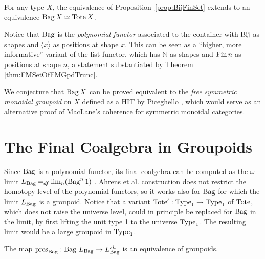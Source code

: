 \documentclass[a4paper,USenglish,cleveref]{lipics-v2021}
\begin{document}
  \begin{proposition}\label{prop:BagTote}
    For any type $X$, the equivalence of Proposition~\ref{prop:BijFinSet} extends to an equivalence $\Bag X \simeq \Tote X$.
  \end{proposition}
 Notice that $\Bag$ is the \emph{polynomial functor} associated to the container with $\Bij$ as shapes and $\langle x \rangle$ as positions at shape $x$. This can be seen as a \enquote{higher, more informative} variant of the list functor, which has $ℕ$ as shapes and $\Fin n$ as positions at shape $n$, a statement substantiated by Theorem \ref{thm:FMSetOfFMGpdTrunc}.

We conjecture that $\Bag X$ can be proved equivalent to the \emph{free symmetric monoidal groupoid} on $X$ defined as a HIT by Piceghello \cite{Piceghello2021}, which would serve as an alternative proof of MacLane's coherence for symmetric monoidal categories.


\section{The Final Coalgebra in Groupoids}\label{sec:final-coalgebra-groupoids}



Since $\Bag$ is a polynomial functor, its final coalgebra can be computed as the $\omega$-limit $\Lim{\Bag} \DefEq \lim_n (\Bag^n 1)$ \cite{Ahrens2015}. Ahrens et al. construction does not restrict the homotopy level of the polynomial functors, so it works also for $\Bag$ for which the limit $\Lim{\Bag}$ is a groupoid. Notice that a variant $\Tote' : \Type_1 \to \Type_1$ of $\Tote$, which does not raise the universe level, could in principle be replaced for $\Bag$ in the limit, by first lifting the unit type 1 to the universe $\Type_1$. The resulting limit would be a large groupoid in $\Type_1$.
\begin{theorem}\label{thm:FMGpdLim}
  The map $\pres{\Bag} : \Bag\,\Lim{\Bag} \to \LimSh{\Bag}$ is an equivalence of groupoids.
\end{theorem}
\end{document}
